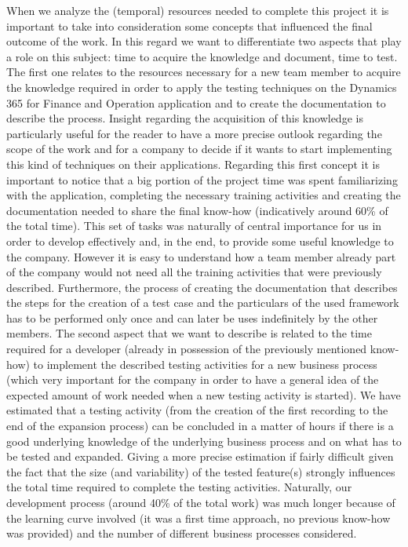 When we analyze the (temporal) resources needed to complete this project it is important to take into consideration some concepts that influenced the final outcome of the work. In this regard we want to differentiate two aspects that play a role on this subject: time to acquire the knowledge and document, time to test.
The first one relates to the resources necessary for a new team member to acquire the knowledge required in order to apply the testing techniques on the Dynamics 365 for Finance and Operation application and to create the documentation to describe the process. Insight regarding the acquisition of this knowledge is particularly useful for the reader to have a more precise outlook regarding the scope of the work and for a company to decide if it wants to start implementing this kind of techniques on their applications. Regarding this first concept it is important to notice that a big portion of the project time was spent familiarizing with the application, completing the necessary training activities and creating the documentation needed to share the final know-how (indicatively around 60\% of the total time). This set of tasks was naturally of central importance for us in order to develop effectively and, in the end, to provide some useful knowledge to the company. However it is easy to understand how a team member already part of the company would not need all the training activities that were previously described. Furthermore, the process of creating the documentation that describes the steps for the creation of a test case and the particulars of the used framework has to be performed only once and can later be uses indefinitely by the other members.
The second aspect that we want to describe is related to the time required for a developer (already in possession of the previously mentioned know-how) to implement the described testing activities for a new business process (which very important for the company in order to have a general idea of the expected amount of work needed when a new testing activity is started). We have estimated that a testing activity (from the creation of the first recording to the end of the expansion process) can be concluded in a matter of hours if there is a good underlying knowledge of the underlying business process and on what has to be tested and expanded. Giving a more precise estimation if fairly difficult given the fact that the size (and variability) of the tested feature(s) strongly influences the total time required to complete the testing activities. Naturally, our development process (around 40\% of the total work) was much longer because of the learning curve involved (it was a first time approach, no previous know-how was provided) and the number of different business processes considered. 

